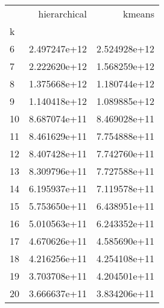 \begin{tabular}{lrr}
\toprule
{} &  hierarchical &        kmeans \\
k  &               &               \\
\midrule
6  &  2.497247e+12 &  2.524928e+12 \\
7  &  2.222620e+12 &  1.568259e+12 \\
8  &  1.375668e+12 &  1.180744e+12 \\
9  &  1.140418e+12 &  1.089885e+12 \\
10 &  8.687074e+11 &  8.469028e+11 \\
11 &  8.461629e+11 &  7.754888e+11 \\
12 &  8.407428e+11 &  7.742760e+11 \\
13 &  8.309796e+11 &  7.727588e+11 \\
14 &  6.195937e+11 &  7.119578e+11 \\
15 &  5.753650e+11 &  6.438951e+11 \\
16 &  5.010563e+11 &  6.243352e+11 \\
17 &  4.670626e+11 &  4.585690e+11 \\
18 &  4.216256e+11 &  4.254108e+11 \\
19 &  3.703708e+11 &  4.204501e+11 \\
20 &  3.666637e+11 &  3.834206e+11 \\
\bottomrule
\end{tabular}
